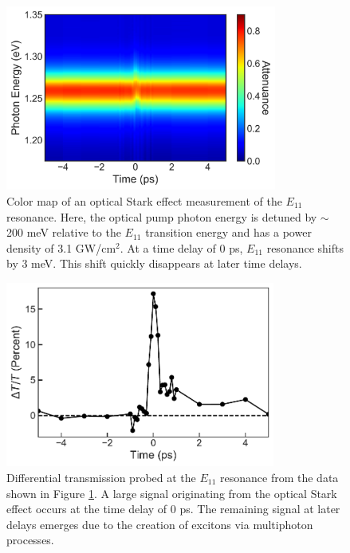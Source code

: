 \begin{figure}[ht]
  \centering
  \includegraphics[height=2.4in]{images/chapter_coherent/ose_abs_map}
  \caption{ Color map of an optical Stark effect measurement of the $E_{11}$ resonance. Here, the optical pump photon energy is detuned by $\sim$200 meV relative to the $E_{11}$ transition energy and has a power density of 3.1 GW/cm$^2$. At a time delay of 0 ps, $E_{11}$ resonance shifts by 3 meV. This shift quickly disappears at later time delays. }
  \label{fig:ose_color_map}
\end{figure}

\begin{figure}[ht]
  \centering
  \includegraphics[height=2.4in]{images/chapter_coherent/ose_dt}
  \caption{Differential transmission probed at the $E_{11}$ resonance from the data shown in Figure \ref{fig:ose_color_map}. A large signal originating from the optical Stark effect occurs at the time delay of 0 ps. The remaining signal at later delays emerges due to the creation of excitons via multiphoton processes. }
  \label{fig:ose_dtt}
\end{figure}

